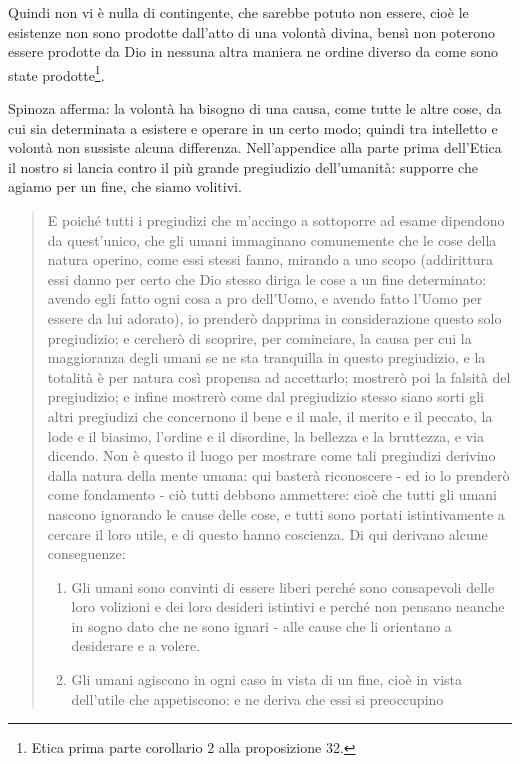 Quindi non vi è nulla di contingente, che sarebbe potuto non essere, cioè le esistenze non sono prodotte dall'atto di una volontà divina, bensì non poterono essere prodotte da Dio in nessuna altra maniera ne ordine diverso da come sono state prodotte\footnote{Etica prima parte corollario 2 alla proposizione 32.}.


Spinoza afferma: la volontà ha bisogno di una causa, come tutte le altre cose, da cui sia determinata a esistere e operare in un certo modo; quindi tra intelletto e volontà non sussiste alcuna differenza. Nell'appendice alla parte prima dell'Etica il nostro si lancia contro il più grande pregiudizio dell'umanità: supporre che agiamo per un fine, che siamo volitivi.
\begin{quotation}
	\small E poiché
	tutti i pregiudizi che m’accingo a sottoporre ad esame dipendono da quest’unico, che gli
	umani immaginano comunemente che le cose della natura operino, come essi stessi fanno,
	mirando a uno scopo (addirittura essi danno per certo che Dio stesso diriga le cose a un fine determinato: avendo egli fatto ogni cosa a pro dell’Uomo, e avendo fatto l’Uomo per essere da lui adorato), io prenderò dapprima in considerazione questo solo pregiudizio; e cercherò di scoprire, per cominciare, la causa per cui la maggioranza degli umani se ne sta
	tranquilla in questo pregiudizio, e la totalità è per natura così propensa ad accettarlo; mostrerò poi la falsità del pregiudizio; e infine mostrerò come dal pregiudizio stesso
	siano sorti gli altri pregiudizi che concernono il bene e il male, il merito e il peccato, la lode
	e il biasimo, l’ordine e il disordine, la bellezza e la bruttezza, e via dicendo. Non è questo il
	luogo per mostrare come tali pregiudizi derivino dalla natura della mente umana: qui basterà riconoscere - ed io lo prenderò come fondamento - ciò tutti debbono ammettere: cioè
	che tutti gli umani nascono ignorando le cause delle cose, e tutti sono portati istintivamente a cercare il loro utile, e di questo hanno coscienza. Di qui derivano alcune conseguenze:
	\begin{enumerate}
		\item Gli umani sono convinti di essere liberi perché sono consapevoli delle loro volizioni e
		dei loro desideri istintivi e perché non pensano neanche in sogno dato che ne sono ignari -
		alle cause che li orientano a desiderare e a volere.
		\item Gli umani agiscono in ogni caso in vista di un fine, cioè in vista dell’utile che appetiscono: e ne deriva che essi si preoccupino

\end{enumerate}
\end{quotation}
